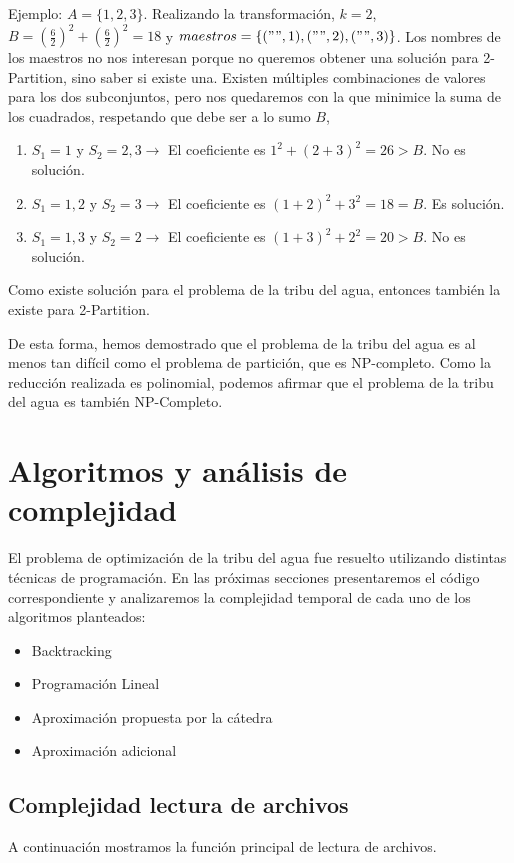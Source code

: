\documentclass{article}
\begin{document}
Ejemplo: $A = \{1, 2, 3\}$. Realizando la transformación, $k = 2$, $B = (\frac{6}{2})^2 + (\frac{6}{2})^2 = 18$ y $maestros = \{("", 1), ("", 2), ("", 3)\}$. Los nombres de los maestros no nos interesan porque no queremos obtener una solución para 2-Partition, sino saber si existe una. Existen múltiples combinaciones de valores para los dos subconjuntos, pero nos quedaremos con la que minimice la suma de los cuadrados, respetando que debe ser a lo sumo $B$,
\begin{enumerate}
    \item $S_1 = {1}$ y $S_2 = {2, 3} \rightarrow$ El coeficiente es $1^2 + (2 + 3)^2 = 26 > B$. No es solución.
    \item $S_1 = {1, 2}$ y $S_2 = {3} \rightarrow$ El coeficiente es $(1 + 2)^2 + 3^2 = 18 = B$. Es solución.
    \item $S_1 = {1, 3}$ y $S_2 = {2} \rightarrow$ El coeficiente es $(1 + 3)^2 + 2^2 = 20 > B$. No es solución.    
\end{enumerate}
Como existe solución para el problema de la tribu del agua, entonces también la existe para 2-Partition.

De esta forma, hemos demostrado que el problema de la tribu del agua es al menos tan difícil como el problema de partición, que es NP-completo. Como la reducción realizada es polinomial, podemos afirmar que el problema de la tribu del agua es también NP-Completo.

\section{Algoritmos y análisis de complejidad}

El problema de optimización de la tribu del agua fue resuelto utilizando distintas técnicas de programación. En las próximas secciones presentaremos el código correspondiente y analizaremos la complejidad temporal de cada uno de los algoritmos planteados:
\begin{itemize}
    \item Backtracking
    \item Programación Lineal
    \item Aproximación propuesta por la cátedra
    \item Aproximación adicional
\end{itemize}

\subsection{Complejidad lectura de archivos}
A continuación mostramos la función principal de lectura de archivos. 
\inputminted[linenos, firstline=30, lastline=45]{python}{codigo/archivos.py}
\end{document}
